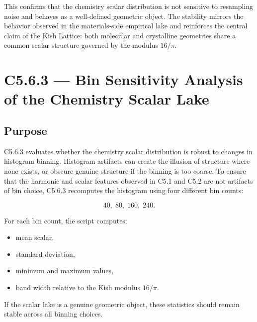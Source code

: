 \documentclass[11pt, letterpaper, openany]{book}
\begin{document}
This confirms that the chemistry scalar distribution is not sensitive to
resampling noise and behaves as a well‑defined geometric object. The stability
mirrors the behavior observed in the materials‑side empirical lake and reinforces
the central claim of the Kish Lattice: both molecular and crystalline geometries
share a common scalar structure governed by the modulus \(16/\pi\).


\section{C5.6.3 — Bin Sensitivity Analysis of the Chemistry Scalar Lake}

\subsection*{Purpose}
C5.6.3 evaluates whether the chemistry scalar distribution is robust to changes
in histogram binning. Histogram artifacts can create the illusion of structure
where none exists, or obscure genuine structure if the binning is too coarse.
To ensure that the harmonic and scalar features observed in C5.1 and C5.2 are
not artifacts of bin choice, C5.6.3 recomputes the histogram using four
different bin counts:



\[
40,\; 80,\; 160,\; 240.
\]



For each bin count, the script computes:

\begin{itemize}
    \item mean scalar,
    \item standard deviation,
    \item minimum and maximum values,
    \item band width relative to the Kish modulus \(16/\pi\).
\end{itemize}

If the scalar lake is a genuine geometric object, these statistics should remain
stable across all binning choices.
\end{document}

